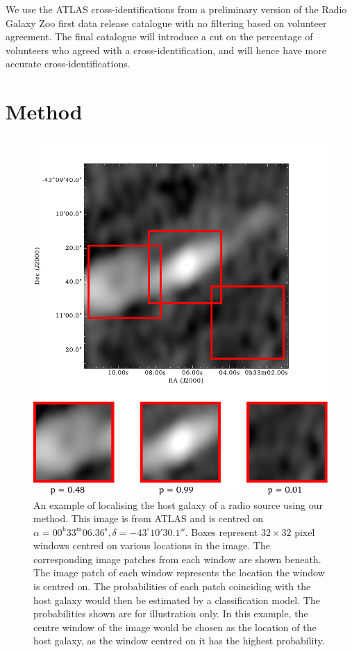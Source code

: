 \documentclass[fleqn,usenatbib,usedcolumn]{mnras}
\begin{document}
    We use the ATLAS cross-identifications from a preliminary version of the
    Radio Galaxy Zoo first data release catalogue with no filtering based on
    volunteer agreement. The final catalogue will introduce a cut on the
    percentage of volunteers who agreed with a cross-identification, and will
    hence have more accurate cross-identifications.

  \section{Method}\label{sec:method}
    \begin{figure}
      \centering
      \includegraphics[width=\columnwidth]{images/elais_0093C1_with_boxes}
      \caption{An example of localising the host galaxy of a radio source using
        our method. This image is from ATLAS and is centred on $\alpha =
        00^\text{h}33^\text{m}06.36^\text{s}, \delta = -43^\circ{}10'30.1''$.
        Boxes represent $32 \times 32$ pixel windows centred on various
        locations in the image. The corresponding image patches from each
        window are shown beneath. The image patch of each window represents
        the location the window is centred on. The probabilities of each patch
        coinciding with the host galaxy would then be estimated by a
        classification model. The probabilities shown are for illustration
        only. In this example, the centre window of the image would be chosen
        as the location of the host galaxy, as the window centred on it has
        the highest probability.}
      \label{fig:windows}
    \end{figure}
\end{document}
